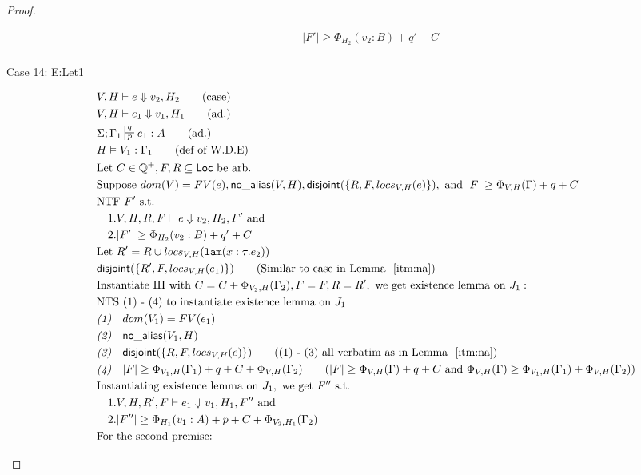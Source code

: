 \documentclass[11pt]{article}
\newcommand{\ms}[1]{\ensuremath{\mathsf{#1}}}
\newcommand{\irl}[1]{\mathtt{#1}}
\newcommand{\na}[1]{\mathsf{no\_alias}(#1)}
\newcommand{\dist}[1]{\mathsf{disjoint}(#1)}
\theoremstyle{definition}
\begin{document}
\begin{proof}
\begin{description}
\begin{align*}
  &|F'| \ge \Phi_{H_2}(v_2:B) + q' + C \tag{from IH}\\
  \end{align*}
  \item [Case 14: E:Let1]
  \begin{align*}
  &V,H \vdash e \Downarrow v_2,H_2 \tag{case}\\
  &V,H \vdash e_1 \Downarrow v_1,H_1 \tag{ad.}\\
  &\Sigma; \Gamma_1 \sststile{p}{q} e_1 : A \tag{ad.}\\
  &H \vDash V_1 : \Gamma_1 \tag{def of W.D.E}\\
  &\text{Let } C \in \mathbb{Q}^+, F,R \subseteq \ms{Loc} \text{ be arb.}\\
  &\text{Suppose }  dom(V) = FV(e),\na{V,H}, \dist{\{R,F,locs_{V,H}(e)\}}, \text{ and } |F| \ge \Phi_{V,H}(\Gamma) + q + C\\
  &\text{NTF } F' \text{ s.t. }\\
  &\quad 1. V,H,R,F \vdash e \Downarrow v_2, H_2,F' \text{ and }\\ 
  &\quad 2. |F'| \ge \Phi_{H_2}(v_2:B) + q' + C\\
  &\text{Let } R' = R \cup locs_{V,H}(\irl{lam}(x : \tau.e_2))\\
  &\dist{\{R',F,locs_{V,H}(e_1)\}} \tag{Similar to case in Lemma $~\ref{itm:na}$}\\
  &\text{Instantiate IH with } C = C + \Phi_{V_2,H}(\Gamma_2), F = F, R = R', \text{ we get existence lemma on } J_1:\\
  &\text{NTS (1) - (4) to instantiate existence lemma on } J_1\\
  &\emph{(1)} \quad dom(V_1) = FV(e_1)\\
  &\emph{(2)} \quad \na{V_1,H}\\
  &\emph{(3)} \quad \dist{\{R,F,locs_{V,H}(e)\}} \tag{(1) - (3) all verbatim as in Lemma $~\ref{itm:na}$}\\
  &\emph{(4)} \quad |F| \ge \Phi_{V_1,H}(\Gamma_1) + q + C + \Phi_{V,H}(\Gamma_2) \tag{$|F| \ge \Phi_{V,H}(\Gamma) + q + C$ and $\Phi_{V,H}(\Gamma) \ge \Phi_{V_1,H}(\Gamma_1) + \Phi_{V,H}(\Gamma_2)$}\\
  &\text{Instantiating existence lemma on } J_1, \text{ we get }  F'' \text{ s.t. }\\
  &\quad 1. V,H,R',F \vdash e_1 \Downarrow v_1, H_1,F'' \text{ and }\\ 
  &\quad 2. |F''| \ge \Phi_{H_1}(v_1:A) + p + C + \Phi_{V_2,H_1}(\Gamma_2)\\
  &\text{For the second premise: }\\

\end{align*}
\end{description}
\end{proof}
\end{document}
